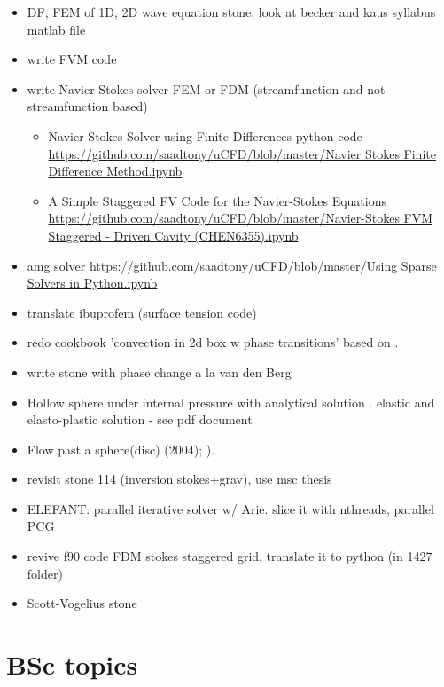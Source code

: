 \documentclass[a4paper]{article}
\begin{document}
\begin{itemize}
\item DF, FEM of 1D, 2D wave equation stone, look at becker and kaus syllabus matlab file
\item write FVM code
\item write Navier-Stokes solver FEM or FDM (streamfunction and not streamfunction based)\\
\begin{itemize}
\item Navier-Stokes Solver using Finite Differences python code 
\url{https://github.com/saadtony/uCFD/blob/master/Navier Stokes Finite Difference Method.ipynb}
\item A Simple Staggered FV Code for the Navier-Stokes Equations
\url{https://github.com/saadtony/uCFD/blob/master/Navier-Stokes FVM Staggered - Driven Cavity (CHEN6355).ipynb}
\end{itemize}
\item amg solver
\url{https://github.com/saadtony/uCFD/blob/master/Using Sparse Solvers in Python.ipynb}

\item translate ibuprofem (surface tension code)
\item redo  cookbook 'convection in 2d box w phase transitions' based on \textcite{chyu85}. 
\item write stone with phase change a la van den Berg \textcite{vava08}
\item Hollow sphere under internal pressure with analytical solution
. elastic and elasto-plastic solution  - see pdf document
\item Flow past a sphere(disc) \textcite{demj04} (2004); 
      \textcite{gafp17}). 
\item revisit stone 114 (inversion stokes+grav), use msc thesis 
\item ELEFANT:  parallel iterative solver w/ Arie. slice it with nthreads, parallel PCG
\item revive f90 code FDM stokes staggered grid, translate it to python 
(in 1427 folder)
\item Scott-Vogelius stone
\end{itemize}

\newpage
\section{BSc topics}
\end{document}
